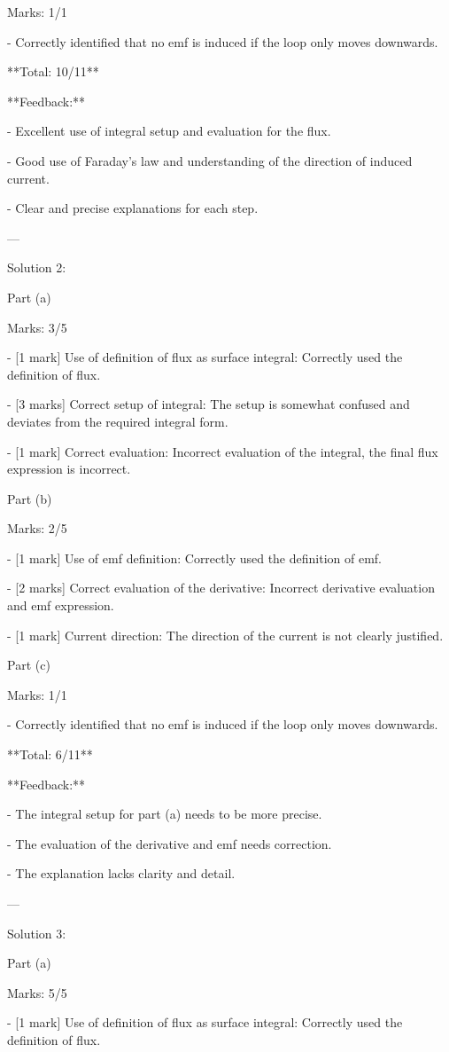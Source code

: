 \documentclass[a4paper,11pt]{article}
\begin{document}
Marks: 1/1

- Correctly identified that no emf is induced if the loop only moves downwards.

**Total: 10/11**

**Feedback:**

- Excellent use of integral setup and evaluation for the flux.

- Good use of Faraday’s law and understanding of the direction of induced current.

- Clear and precise explanations for each step.

---

Solution 2:

Part (a)

Marks: 3/5

- [1 mark] Use of definition of flux as surface integral: Correctly used the definition of flux.

- [3 marks] Correct setup of integral: The setup is somewhat confused and deviates from the required integral form.

- [1 mark] Correct evaluation: Incorrect evaluation of the integral, the final flux expression is incorrect.

Part (b)

Marks: 2/5

- [1 mark] Use of emf definition: Correctly used the definition of emf.

- [2 marks] Correct evaluation of the derivative: Incorrect derivative evaluation and emf expression.

- [1 mark] Current direction: The direction of the current is not clearly justified.

Part (c)

Marks: 1/1

- Correctly identified that no emf is induced if the loop only moves downwards.

**Total: 6/11**

**Feedback:**

- The integral setup for part (a) needs to be more precise.

- The evaluation of the derivative and emf needs correction.

- The explanation lacks clarity and detail.

---

Solution 3:

Part (a)

Marks: 5/5

- [1 mark] Use of definition of flux as surface integral: Correctly used the definition of flux.
\end{document}

